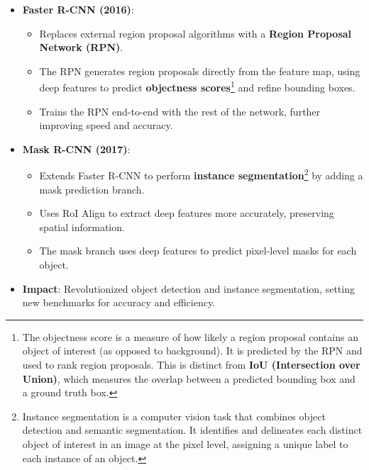 \begin{notechapter}
\begin{itemize}
\begin{itemize}
    \end{itemize}
  \item \textbf{Faster R-CNN (2016)}:
    \begin{itemize}
      \item Replaces external region proposal algorithms with a 
        \textbf{Region Proposal Network (RPN)}.
      \item The RPN generates region proposals directly from the 
        feature map, using deep features to predict \textbf{objectness 
        scores}\footnote{The objectness score is a measure of how 
        likely a region proposal contains an object of interest (as 
        opposed to background). It is predicted by the RPN and used to 
        rank region proposals. This is distinct from \textbf{IoU 
        (Intersection over Union)}, which measures the overlap between 
        a predicted bounding box and a ground truth box.} and refine 
        bounding boxes.
      \item Trains the RPN end-to-end with the rest of the network, 
        further improving speed and accuracy.
    \end{itemize}
  \item \textbf{Mask R-CNN (2017)}:
    \begin{itemize}
      \item Extends Faster R-CNN to perform \textbf{instance 
        segmentation}\footnote{Instance segmentation is a computer 
        vision task that combines object detection and semantic 
        segmentation. It identifies and delineates each distinct object 
        of interest in an image at the pixel level, assigning a unique 
        label to each instance of an object.} by adding a mask 
        prediction branch.
      \item Uses RoI Align to extract deep features more accurately, 
        preserving spatial information.
      \item The mask branch uses deep features to predict pixel-level 
        masks for each object.
    \end{itemize}
  \item \textbf{Impact}: Revolutionized object detection and instance 
    segmentation, setting new benchmarks for accuracy and efficiency.
\end{itemize}


\end{notechapter}
